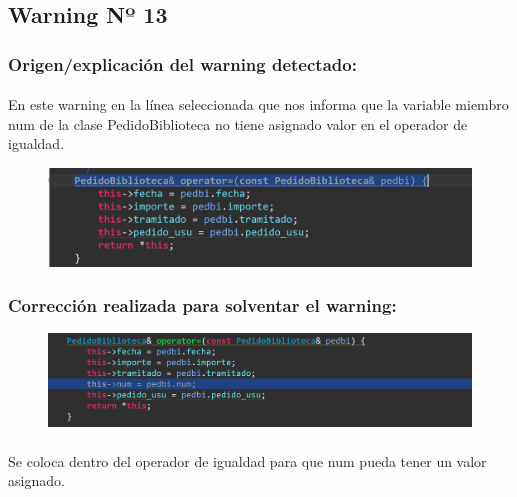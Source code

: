 	\subsection{Warning Nº 13}
	
		\subsubsection{Origen/explicación del warning detectado:}
		
			\paragraph{}En este warning en la línea seleccionada que nos informa que la variable miembro num de la clase PedidoBiblioteca no tiene asignado valor en el operador de igualdad.
			
			\begin{figure}[H]
				\centering
				\includegraphics[scale=0.55]{img/esteban8.png}
				\label{esteban8}
			\end{figure}
		
		\subsubsection{Corrección realizada para solventar el warning:}
		
			\begin{figure}[H]
				\centering
				\includegraphics[scale=0.55]{img/esteban9.png}
				\label{esteban9}
			\end{figure}
		
			\paragraph{}Se coloca dentro del operador de igualdad para que num pueda tener un valor asignado.
			
